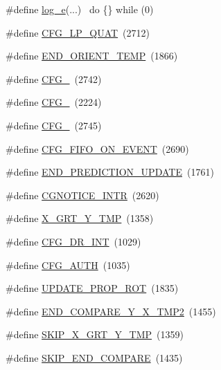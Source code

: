 \begin{DoxyCompactItemize}
\#define \hyperlink{group___d_r_i_v_e_r_s_gac9308c888b394d1b403d9ba6e1f13fd2}{log\+\_\+e}(...)      ~do \{\} while (0)
\item 
\#define \hyperlink{group___d_r_i_v_e_r_s_gadf5652e51b8c08c2eb6a902d1d1f319c}{C\+F\+G\+\_\+\+L\+P\+\_\+\+Q\+U\+AT}~(2712)
\item 
\#define \hyperlink{group___d_r_i_v_e_r_s_ga5c2c9516862587e8e1aa8c0c428076d9}{E\+N\+D\+\_\+\+O\+R\+I\+E\+N\+T\+\_\+\+T\+E\+MP}~(1866)
\item 
\#define \hyperlink{group___d_r_i_v_e_r_s_gaae53afa64170cb4723c04f16c2fa5f30}{C\+F\+G\+\_}~(2742)
\item 
\#define \hyperlink{group___d_r_i_v_e_r_s_ga12aa4c3bdc65c24ca29ef08e62fd3e13}{C\+F\+G\+\_}~(2224)
\item 
\#define \hyperlink{group___d_r_i_v_e_r_s_ga18ca772a0ce432c5ccb0e318af3c2b86}{C\+F\+G\+\_}~(2745)
\item 
\#define \hyperlink{group___d_r_i_v_e_r_s_ga7aa6ed56d6fd41be120b9bdb488c220a}{C\+F\+G\+\_\+\+F\+I\+F\+O\+\_\+\+O\+N\+\_\+\+E\+V\+E\+NT}~(2690)
\item 
\#define \hyperlink{group___d_r_i_v_e_r_s_ga89e5662bddc67ac00f5b85035bd60ed8}{E\+N\+D\+\_\+\+P\+R\+E\+D\+I\+C\+T\+I\+O\+N\+\_\+\+U\+P\+D\+A\+TE}~(1761)
\item 
\#define \hyperlink{group___d_r_i_v_e_r_s_gafd43f64b7c6bc86374cedfcf69c6b12f}{C\+G\+N\+O\+T\+I\+C\+E\+\_\+\+I\+N\+TR}~(2620)
\item 
\#define \hyperlink{group___d_r_i_v_e_r_s_ga0ff907b44d0e42641e71e6da41829090}{X\+\_\+\+G\+R\+T\+\_\+\+Y\+\_\+\+T\+MP}~(1358)
\item 
\#define \hyperlink{group___d_r_i_v_e_r_s_gaca5a7c1f2519e622571bda2aa2311553}{C\+F\+G\+\_\+\+D\+R\+\_\+\+I\+NT}~(1029)
\item 
\#define \hyperlink{group___d_r_i_v_e_r_s_ga93cd3f526d9e31b00c9364bab3df41e0}{C\+F\+G\+\_\+\+A\+U\+TH}~(1035)
\item 
\#define \hyperlink{group___d_r_i_v_e_r_s_gac90829b4b9a77480e0582bb7551e182e}{U\+P\+D\+A\+T\+E\+\_\+\+P\+R\+O\+P\+\_\+\+R\+OT}~(1835)
\item 
\#define \hyperlink{group___d_r_i_v_e_r_s_ga7b344f27570daf0f096213bfcd8e0627}{E\+N\+D\+\_\+\+C\+O\+M\+P\+A\+R\+E\+\_\+\+Y\+\_\+\+X\+\_\+\+T\+M\+P2}~(1455)
\item 
\#define \hyperlink{group___d_r_i_v_e_r_s_gab280108da935f42e6a3e30d6af04a7c1}{S\+K\+I\+P\+\_\+\+X\+\_\+\+G\+R\+T\+\_\+\+Y\+\_\+\+T\+MP}~(1359)
\item 
\#define \hyperlink{group___d_r_i_v_e_r_s_ga962a3b26ee2dd822ebc67d5ed7e01bc1}{S\+K\+I\+P\+\_\+\+E\+N\+D\+\_\+\+C\+O\+M\+P\+A\+RE}~(1435)

\end{DoxyCompactItemize}
